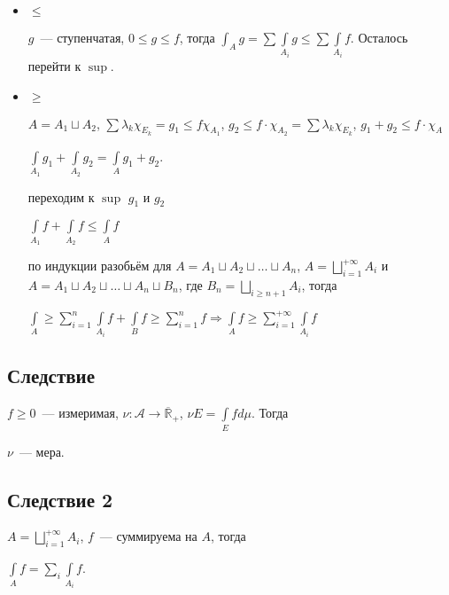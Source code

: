 \documentclass{article}
\begin{document}
            \begin{itemize}
            
                \item $\leqslant$
                
                    $g$~--- ступенчатая, $0 \leqslant g \leqslant f$, тогда $\int_A g = \sum \int\limits_{A_i} g \leqslant \sum \int\limits_{A_i} f$. Осталось перейти к $\sup$.
                    
                \item $\geqslant$
                
                    $A = A_1 \sqcup A_2$, $\sum \lambda_k \chi_{E_k} = g_1 \leqslant f \chi_{A_1}$, $g_2 \leqslant f \cdot \chi_{A_2} = \sum \lambda_k \chi_{E_k}$, $g_1 + g_2 \leqslant f \cdot \chi_{A}$
                    
                    $\int\limits_{A_1} g_1 + \int\limits_{A_2} g_2 = \int\limits_{A} g_1 + g_2$.
                    
                    переходим к $\sup$ $g_1$ и $g_2$
                    
                    $\int\limits_{A_1} f + \int\limits_{A_2} f \leqslant \int\limits_{A} f$
                    
                    по индукции разобьём для $A = A_1 \sqcup A_2 \sqcup \ldots \sqcup A_n$, $A = \bigsqcup\limits^{+\infty}_{i = 1} A_i$ и $A = A_1 \sqcup A_2 \sqcup \ldots \sqcup A_n \sqcup B_n$, где $B_n = \bigsqcup\limits_{i \geqslant n + 1} A_i$, тогда
                    
                    $\int\limits_{A} \geqslant \sum\limits^n_{i = 1} \int\limits_{A_i} f + \int\limits_{B} f \geqslant \sum\limits^n_{i = 1} f \Rightarrow \int\limits_{A}f \geqslant \sum\limits^{+\infty}_{i = 1} \int\limits_{A_i} f$
                    
            \end{itemize}
            
    \subsection{Следствие}
    
        $f \geqslant 0$~--- измеримая, $\nu : \mathcal{A} \rightarrow \overline{\mathbb{R}}_+$, $\nu E = \int\limits_{E} f d \mu$. Тогда
        
            $\nu$~--- мера.
            
    \subsection{Следствие 2}
    
        $A = \bigsqcup\limits_{i = 1}^{+\infty} A_i$, $f$~--- суммируема на $A$, тогда 
        
            $\int\limits_{A} f = \sum\limits_{i} \int\limits_{A_i} f$.
        
\end{document}
